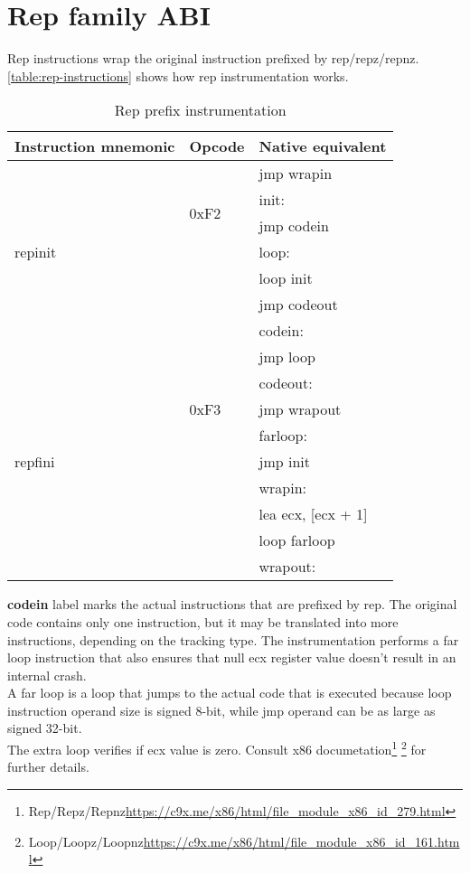 \documentclass[12pt]{report}
\begin{document}
\section{Rep family ABI}
\label{sec:rep-family-abi}
Rep instructions wrap the original instruction prefixed by rep/repz/repnz. \autoref{table:rep-instructions} shows how rep instrumentation works.\\
\begin{table}[H]
	\begin{tabular}{| l | l | l |}
		\hline
		\textbf{Instruction mnemonic} & \textbf{Opcode} & \textbf{Native equivalent}\\ \hline
		\multirow{7}{*}{repinit} & \multirow{4}{*}{0xF2} & \tab jmp wrapin\\
		& & init:\\
		& & \tab jmp codein\\
		& & loop:\\
		& & \tab loop init\\
		& & \tab jmp codeout\\
		& & codein:\\ \hline
		\multirow{9}{*}{repfini} & \multirow{5}{*}{0xF3} & \tab jmp loop\\
		& & codeout:\\
		& & \tab jmp wrapout\\
		& & farloop:\\
		& & \tab jmp init\\
		& & wrapin:\\
		& & \tab lea ecx, [ecx + 1]\\
		& & \tab loop farloop\\
		& & wrapout:\\ \hline
	\end{tabular}
	\caption{Rep prefix instrumentation}
	\label{table:rep-instructions}
\end{table}

\textbf{codein} label marks the actual instructions that are prefixed by rep. The original code contains only one instruction, but it may be translated into more instructions, depending on the tracking type. The instrumentation performs a far loop instruction that also ensures that null ecx register value doesn't result in an internal crash.\\
A far loop is a loop that jumps to the actual code that is executed because loop instruction operand size is signed 8-bit, while jmp operand can be as large as signed 32-bit.\\
The extra loop verifies if ecx value is zero. Consult x86 documetation\footnote{Rep/Repz/Repnz\url{https://c9x.me/x86/html/file_module_x86_id_279.html}} \footnote{Loop/Loopz/Loopnz\url{https://c9x.me/x86/html/file_module_x86_id_161.html}} for further details.
\end{document}
